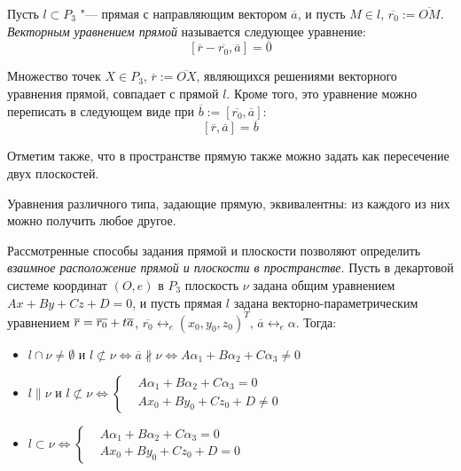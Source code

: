     \begin{definition}
    	Пусть $l \subset P_3$ "--- прямая с направляющим вектором $\overline{a}$, и пусть $M \in l$, $\overline{r_0} := \overline{OM}$. \textit{Векторным уравнением прямой} называется следующее уравнение:
    	\[[\overline{r} - \overline{r_0}, \overline{a}] = \overline{0}\]
    \end{definition}
    
    \begin{note}
    	Множество точек $X \in P_3$, $\overline{r} := \overline{OX}$, являющихся решениями векторного уравнения прямой, совпадает с прямой $l$. Кроме того, это уравнение можно переписать в следующем виде при $\overline{b} := [\overline{r_0}, \overline{a}]$:
    	\[[\overline{r}, \overline{a}]= \overline b\]
    	
    	Отметим также, что в пространстве прямую также можно задать как пересечение двух плоскостей.
    \end{note}

    \begin{note}
    	Уравнения различного типа, задающие прямую, эквивалентны: из каждого из них можно получить любое другое.
    \end{note}
    
    \begin{note}
    	Рассмотренные способы задания прямой и плоскости позволяют определить \textit{взаимное расположение прямой и плоскости в пространстве}. Пусть в декартовой системе координат $(O, e)$ в $P_3$ плоскость $\nu$ задана общим уравнением $Ax + By + Cz + D = 0$, и пусть прямая $l$ задана векторно-параметрическим уравнением $\overline{r} \hm{=} \overline{r_0} + t\overline{a}$, $\overline{r_0} \leftrightarrow_{e} (x_0, y_0, z_0)^T$, $\overline{a} \leftrightarrow_{e} \alpha$. Тогда:
    	\begin{itemize}
    		\item $l \cap \nu \ne \emptyset \text{ и }  l \not\subset \nu \Leftrightarrow \overline{a} \nparallel \nu \Leftrightarrow A\alpha_1 + B\alpha_2 + C\alpha_3 \ne 0$
    		\item $l \parallel \nu \text{ и } l \not\subset \nu \Leftrightarrow
    		\left\{\begin{aligned}
    		&A\alpha_1 + B\alpha_2 + C\alpha_3 = 0\\
    		&Ax_0 + By_0 + Cz_0 + D \ne 0
    		\end{aligned}\right.$
    		\item $l \subset \nu \Leftrightarrow
    		\left\{\begin{aligned}
    		&A\alpha_1 + B\alpha_2 + C\alpha_3 = 0\\
    		&Ax_0 + By_0 + Cz_0 + D = 0
    		\end{aligned}\right.$
    	\end{itemize}
    \end{note}
    

